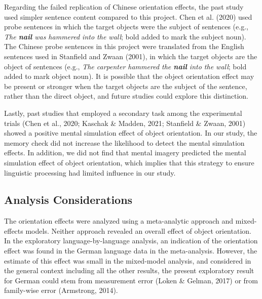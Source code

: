 \documentclass[
  man,floatsintext]{apa7}
\begin{document}
Regarding the failed replication of Chinese orientation effects, the
past study used simpler sentence content compared to this project.
Chen et al. (2020) used probe sentences in which the target objects
were the subject of sentences (e.g., \emph{The \textbf{nail} was hammered into the
wall}; bold added to mark the subject noun). The Chinese probe sentences
in this project were translated from the English sentences used in
Stanfield and Zwaan (2001), in which the target objects are the object of
sentences (e.g., \emph{The carpenter hammered the \textbf{nail} into the wall};
bold added to mark object noun). It is possible that the object
orientation effect may be present or stronger when the target objects
are the subject of the sentence, rather than the direct object, and
future studies could explore this distinction.

Lastly, past studies that employed a secondary task among the
experimental trials (Chen et al., 2020; Kaschak \& Madden, 2021; Stanfield \& Zwaan, 2001) showed a
positive mental simulation effect of object orientation. In our study,
the memory check did not increase the likelihood to detect the mental
simulation effects. In addition, we did not find that mental imagery
predicted the mental simulation effect of object orientation, which
implies that this strategy to ensure linguistic processing had limited
influence in our study.

\hypertarget{analysis-considerations}{%
\subsection{Analysis Considerations}\label{analysis-considerations}}

The orientation effects were analyzed using a meta-analytic approach and
mixed-effects models. Neither approach revealed an overall effect of
object orientation. In the exploratory language-by-language analysis, an
indication of the orientation effect was found in the German language
data in the meta-analysis. However, the estimate of this effect was
small in the mixed-model analysis, and considered in the general context
including all the other results, the present exploratory result for
German could stem from measurement error
(Loken \& Gelman, 2017) or from family-wise error
(Armstrong, 2014).
\end{document}
